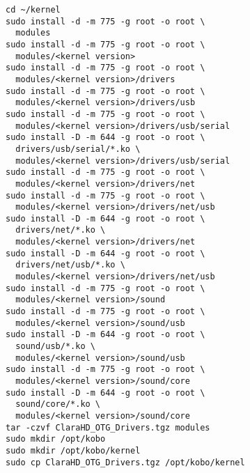 \begin{verbatim}
cd ~/kernel
sudo install -d -m 775 -g root -o root \
  modules
sudo install -d -m 775 -g root -o root \
  modules/<kernel version>
sudo install -d -m 775 -g root -o root \
  modules/<kernel version>/drivers
sudo install -d -m 775 -g root -o root \
  modules/<kernel version>/drivers/usb
sudo install -d -m 775 -g root -o root \
  modules/<kernel version>/drivers/usb/serial
sudo install -D -m 644 -g root -o root \
  drivers/usb/serial/*.ko \
  modules/<kernel version>/drivers/usb/serial
sudo install -d -m 775 -g root -o root \
  modules/<kernel version>/drivers/net
sudo install -d -m 775 -g root -o root \
  modules/<kernel version>/drivers/net/usb
sudo install -D -m 644 -g root -o root \
  drivers/net/*.ko \
  modules/<kernel version>/drivers/net
sudo install -D -m 644 -g root -o root \
  drivers/net/usb/*.ko \
  modules/<kernel version>/drivers/net/usb
sudo install -d -m 775 -g root -o root \
  modules/<kernel version>/sound
sudo install -d -m 775 -g root -o root \
  modules/<kernel version>/sound/usb
sudo install -D -m 644 -g root -o root \
  sound/usb/*.ko \
  modules/<kernel version>/sound/usb
sudo install -d -m 775 -g root -o root \
  modules/<kernel version>/sound/core
sudo install -D -m 644 -g root -o root \
  sound/core/*.ko \
  modules/<kernel version>/sound/core
tar -czvf ClaraHD_OTG_Drivers.tgz modules
sudo mkdir /opt/kobo
sudo mkdir /opt/kobo/kernel
sudo cp ClaraHD_OTG_Drivers.tgz /opt/kobo/kernel
\end{verbatim}
